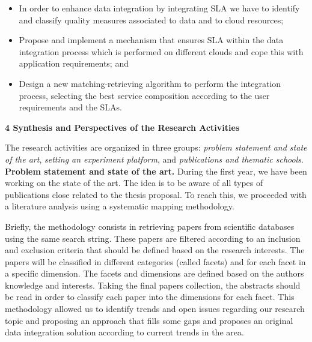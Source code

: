 \documentclass[12pt,a4paper,oneside]{report}
\begin{document}
\begin{itemize}

\item In order to enhance data integration by integrating SLA we have to identify and classify quality measures associated to data and to cloud resources;

\item Propose and implement a mechanism that ensures SLA within the data integration process which is performed on different clouds and cope this with application requirements; and


\item Design a new matching-retrieving algorithm to perform the integration process, selecting the best service composition according to the user requirements and the SLAs.

\end{itemize}

 
\begin{flushleft}
\textbf{4 Synthesis and Perspectives of the Research Activities}\\
\end{flushleft}

The research activities are organized in three groups: \emph{problem statement and state of the art}, \emph{setting an experiment platform}, and \emph{publications and thematic schools}.
%
\bigskip
\\
\textbf{Problem statement and state of the art.} During the first year, we have been working on the state of the art. 
The idea is to be aware of all types of publications close related to the thesis proposal. To reach this, we proceeded with a literature analysis using a systematic mapping methodology. 

Briefly, the methodology consists in retrieving papers from scientific databases using the same search string. These papers are filtered according to an inclusion and exclusion criteria that should be defined based on the research interests. The papers will be classified in different categories (called facets) and for each facet in a specific dimension. The facets and dimensions are defined based on the authors knowledge and interests. Taking the final papers collection, the abstracts should be read in order to classify each paper into the dimensions for each facet. 
This methodology allowed us to identify trends and open issues regarding our research topic and proposing an approach that fills some gaps and proposes an original data integration solution according to current trends in the area.
\end{document}

